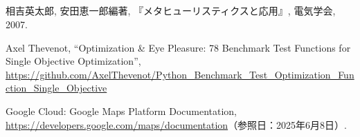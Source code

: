 \begin{center}
	\section*{}                      %
	\vspace*{-2zh}
\end{center}


\begin{thebibliography}{99}

	相吉英太郎, 安田恵一郎編著, 『メタヒューリスティクスと応用』, 電気学会, 2007.
	
	Axel Thevenot, ``Optimization \& Eye Pleasure: 78 Benchmark Test Functions for Single Objective Optimization'',\\
	\url{https://github.com/AxelThevenot/Python_Benchmark_Test_Optimization_Function_Single_Objective}
	
	Google Cloud: Google Maps Platform Documentation,\\
	\url{https://developers.google.com/maps/documentation}（参照日：2025年6月8日）.
	
	\end{thebibliography}